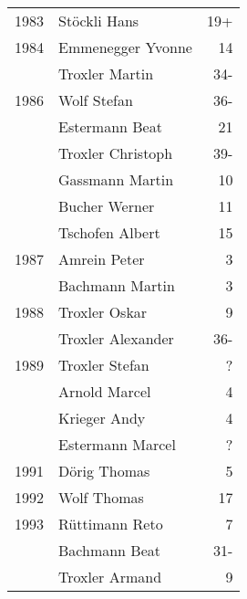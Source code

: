 {\begin{longtable}{ l l r }
        1983          & Stöckli Hans                              & 19+         \\
        1984          & Emmenegger Yvonne                         & 14          \\
                      & Troxler Martin                            & 34-         \\
        1986          & Wolf Stefan                               & 36-         \\
                      & Estermann Beat                            & 21          \\
                      & Troxler Christoph                         & 39-         \\
                      & Gassmann Martin                           & 10          \\
                      & Bucher Werner                             & 11          \\
                      & Tschofen Albert                           & 15          \\
        1987          & Amrein Peter                              & 3           \\
                      & Bachmann Martin                           & 3           \\
        1988          & Troxler Oskar                             & 9           \\
                      & Troxler Alexander                         & 36-         \\
        1989          & Troxler Stefan                            & ?           \\
                      & Arnold Marcel                             & 4           \\
                      & Krieger Andy                              & 4           \\
                      & Estermann Marcel                          & ?           \\
        1991          & Dörig Thomas                              & 5           \\
        1992          & Wolf Thomas                               & 17          \\
        1993          & Rüttimann Reto                            & 7           \\
                      & Bachmann Beat                             & 31-         \\
                      & Troxler Armand                            & 9           \\

\end{longtable}}
